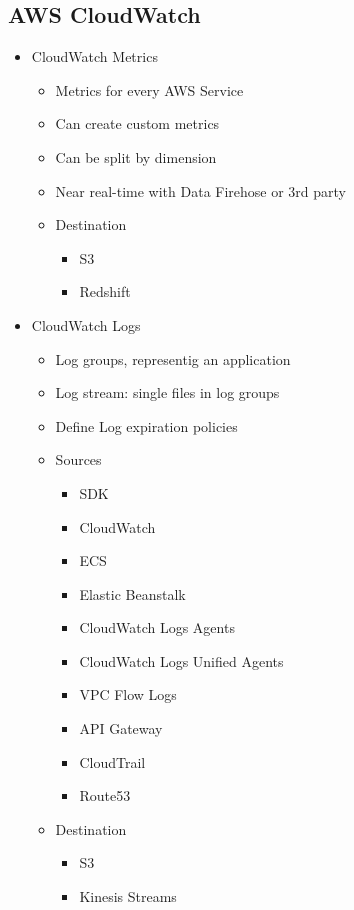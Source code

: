 \documentclass[../../main.tex]{subfiles}
\begin{document}
\subsection{AWS CloudWatch}
\begin{itemize}
    \item CloudWatch Metrics
    \begin{itemize}
        \item Metrics for every AWS Service
        \item Can create custom metrics
        \item Can be split by dimension
        \item Near real-time with Data Firehose or 3rd party
        \item Destination
        \begin{itemize}
            \item S3
            \item Redshift
        \end{itemize}
    \end{itemize}
    \item CloudWatch Logs
    \begin{itemize}
        \item Log groups, representig an application
        \item Log stream: single files in log groups
        \item Define Log expiration policies
        \item Sources
        \begin{itemize}
            \item SDK
            \item CloudWatch
            \item ECS
            \item Elastic Beanstalk
            \item CloudWatch Logs Agents
            \item CloudWatch Logs Unified Agents
            \item VPC Flow Logs
            \item API Gateway
            \item CloudTrail
            \item Route53
        \end{itemize}
        \item Destination
        \begin{itemize}
            \item S3
            \item Kinesis Streams

\end{itemize}
\end{itemize}
\end{itemize}
\end{document}
